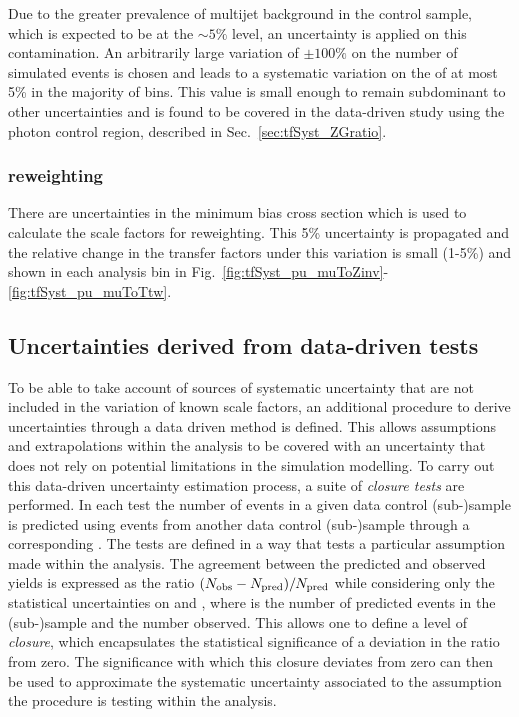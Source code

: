 Due to the greater prevalence of \QCD multijet background in the \gj
control sample, which is expected to be at the $\sim5\%$ level, an
uncertainty is applied on this contamination. An arbitrarily large
variation of $\pm 100\%$ on the number of simulated \QCD events is chosen and
leads to a systematic variation on the \TFs of at most 5\%
in the majority of bins. This value is small enough to remain
subdominant to other uncertainties and is found to be covered in the
data-driven study using the photon control region, described in 
Sec.~\ref{sec:tfSyst_ZGratio}.

\subsubsection*{\PU reweighting}
\label{sec:tfSyst_pu}

There are uncertainties in the minimum bias cross section which is
used to calculate the scale factors for \PU reweighting. This 5\% uncertainty is
propagated and the relative change in the transfer factors under this
variation is small (1-5\%) and shown in each analysis bin in
Fig.~\ref{fig:tfSyst_pu_muToZinv}-\ref{fig:tfSyst_pu_muToTtw}.

\subsection{Uncertainties derived from data-driven tests}
\label{sec:closureTests}

To be able to take account of sources of systematic uncertainty that
are not included in the variation of known scale factors, an
additional procedure to derive uncertainties through a data driven
method is defined. This allows assumptions and extrapolations
within the analysis to be covered with an uncertainty that does not
rely on potential limitations in the simulation modelling. To carry
out this data-driven uncertainty estimation process, a suite of
\emph{closure tests} are performed. In each test the number
of events in a given data control (sub-)sample is predicted using
events from another data control (sub-)sample through a
corresponding \TF. The tests are defined in a way that tests a particular assumption made
within the analysis. The agreement between the predicted and observed
yields is expressed as the ratio $(N_{\textrm{obs}} - N_{\textrm{pred}})/N_{\textrm{pred}}$ while
considering only the statistical uncertainties on \npre and \nobs,
where \npre is the number of predicted events in the (sub-)sample and
\nobs the number observed.  This allows one to define a level of
\emph{closure}, which encapsulates the statistical significance of a
deviation in the ratio from zero. The significance with which
this closure deviates from zero can then be used to approximate the
systematic uncertainty associated to the assumption the procedure is
testing within the analysis.

